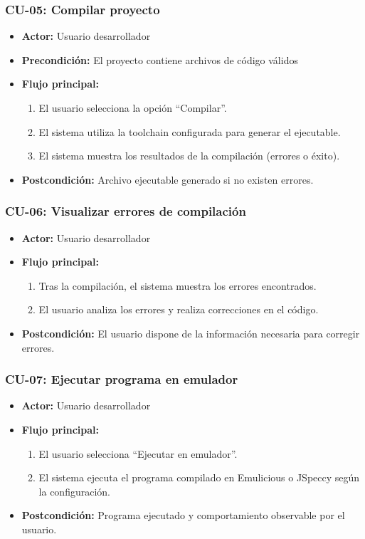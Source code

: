 \documentclass[../../main.tex]{subfiles}
\begin{document}
\subsubsection*{CU-05: Compilar proyecto}
\begin{itemize}
    \item \textbf{Actor:} Usuario desarrollador
    \item \textbf{Precondición:} El proyecto contiene archivos de código válidos
    \item \textbf{Flujo principal:}
        \begin{enumerate}
            \item El usuario selecciona la opción ``Compilar''.
            \item El sistema utiliza la toolchain configurada para generar el ejecutable.
            \item El sistema muestra los resultados de la compilación (errores o éxito).
        \end{enumerate}
    \item \textbf{Postcondición:} Archivo ejecutable generado si no existen errores.
\end{itemize}

\subsubsection*{CU-06: Visualizar errores de compilación}
\begin{itemize}
    \item \textbf{Actor:} Usuario desarrollador
    \item \textbf{Flujo principal:}
        \begin{enumerate}
            \item Tras la compilación, el sistema muestra los errores encontrados.
            \item El usuario analiza los errores y realiza correcciones en el código.
        \end{enumerate}
    \item \textbf{Postcondición:} El usuario dispone de la información necesaria para corregir errores.
\end{itemize}

\subsubsection*{CU-07: Ejecutar programa en emulador}
\begin{itemize}
    \item \textbf{Actor:} Usuario desarrollador
    \item \textbf{Flujo principal:}
        \begin{enumerate}
            \item El usuario selecciona ``Ejecutar en emulador''.
            \item El sistema ejecuta el programa compilado en Emulicious o JSpeccy según la configuración.
        \end{enumerate}
    \item \textbf{Postcondición:} Programa ejecutado y comportamiento observable por el usuario.
\end{itemize}
\end{document}
